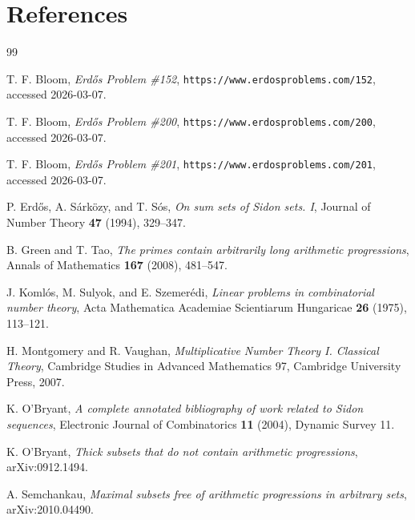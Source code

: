 \bigskip
\section*{References}

\begin{thebibliography}{99}

T. F. Bloom,
\emph{Erd\H{o}s Problem \#152},
\texttt{https://www.erdosproblems.com/152}, accessed 2026-03-07.

T. F. Bloom,
\emph{Erd\H{o}s Problem \#200},
\texttt{https://www.erdosproblems.com/200}, accessed 2026-03-07.

T. F. Bloom,
\emph{Erd\H{o}s Problem \#201},
\texttt{https://www.erdosproblems.com/201}, accessed 2026-03-07.

P. Erd\H{o}s, A. S\'ark\"ozy, and T. S\'os,
\emph{On sum sets of Sidon sets. I},
Journal of Number Theory \textbf{47} (1994), 329--347.

B. Green and T. Tao,
\emph{The primes contain arbitrarily long arithmetic progressions},
Annals of Mathematics \textbf{167} (2008), 481--547.

J. Koml\'os, M. Sulyok, and E. Szemer\'edi,
\emph{Linear problems in combinatorial number theory},
Acta Mathematica Academiae Scientiarum Hungaricae \textbf{26} (1975), 113--121.

H. Montgomery and R. Vaughan,
\emph{Multiplicative Number Theory I. Classical Theory},
Cambridge Studies in Advanced Mathematics 97, Cambridge University Press, 2007.

K. O'Bryant,
\emph{A complete annotated bibliography of work related to Sidon sequences},
Electronic Journal of Combinatorics \textbf{11} (2004), Dynamic Survey 11.

K. O'Bryant,
\emph{Thick subsets that do not contain arithmetic progressions},
arXiv:0912.1494.

A. Semchankau,
\emph{Maximal subsets free of arithmetic progressions in arbitrary sets},
arXiv:2010.04490.

\end{thebibliography}
